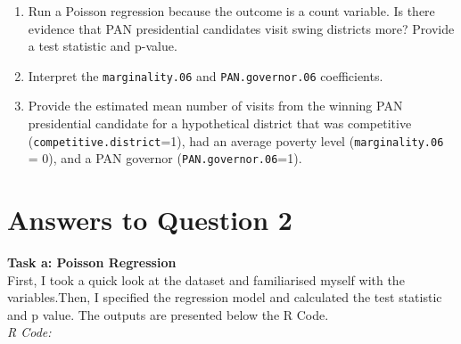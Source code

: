\documentclass[12pt,letterpaper]{article}
\begin{document}
\begin{enumerate}
	\item [(a)]
	Run a Poisson regression because the outcome is a count variable. Is there evidence that PAN presidential candidates visit swing districts more? Provide a test statistic and p-value.

	\item [(b)]
	Interpret the \texttt{marginality.06} and \texttt{PAN.governor.06} coefficients.
	
	\item [(c)]
	Provide the estimated mean number of visits from the winning PAN presidential candidate for a hypothetical district that was competitive (\texttt{competitive.district}=1), had an average poverty level (\texttt{marginality.06} = 0), and a PAN governor (\texttt{PAN.governor.06}=1).
	
\end{enumerate}


\section*{Answers to Question 2}
\vspace{.25cm}
\noindent\textbf{Task a: Poisson Regression}\\
First, I took a quick look at the dataset and familiarised myself with the variables.Then, I specified the regression model and calculated the test statistic and p value. The outputs are presented below the R Code.\\
\textit{R Code:}
  
  
\end{document}

